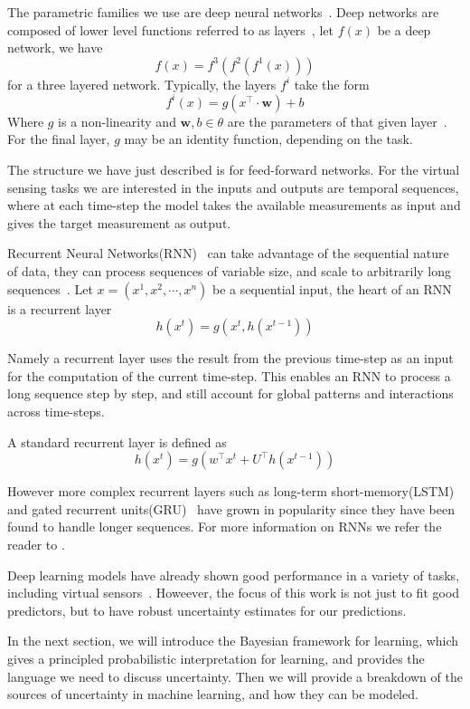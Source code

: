 \documentclass[../main.tex]{subfiles}
\begin{document}
The parametric families we use are deep neural networks~\citep{goodfellow2016deep}. Deep networks are composed of lower level functions referred to as layers~\citep[chapter~6]{goodfellow2016deep}, let $f(x)$ be a deep network, we have  
$$
    f(x) = f^3(f^2(f^1(x)))
$$
for a three layered network. Typically, the layers $f^i$ take the form 
$$
    f^i(x) = g(x^\top \cdot \mathbf{w}) + b
$$
Where $g$ is a non-linearity and $\mathbf{w}, b \in \theta$ are the parameters of that given layer~\citep[chapter~6]{goodfellow2016deep}. For the final layer, $g$ may be an identity function, depending on the task.

The structure we have just described is for feed-forward networks.
For the virtual sensing tasks we are interested in the inputs and outputs are temporal sequences, where at each time-step the model takes the available measurements as input and gives the target measurement as output.

Recurrent Neural Networks(RNN)~\citep{rumelhart1986learning} can take advantage of the sequential nature of data, they can process sequences of variable size, and scale to arbitrarily long sequences~\cite[chapter~10]{goodfellow2016deep}.
Let $x=(x^1, x^2, \cdots, x^n)$ be a sequential input, the heart of an RNN is a recurrent layer
$$
    h(x^t) = g(x^t, h(x^{t-1}))
$$

Namely a recurrent layer uses the result from the previous time-step as an input for the computation of the current time-step. This enables an RNN to process a long sequence step by step, and still account for global patterns and interactions across time-steps. 

A standard recurrent layer is defined as~\citep{pascanu2013construct}
$$
        h(x^t) = g(w^\top x^t + U^\top h(x^{t-1}))
$$

However more complex recurrent layers such as long-term short-memory(LSTM)~\citep{hochreiter1997long} and gated recurrent units(GRU)~\citep{cho2014learning} have grown in popularity since they have been found to handle longer sequences. For more information on RNNs we refer the reader to \cite[chapter~10]{goodfellow2016deep}.

Deep learning models have already shown good performance in a variety of tasks, including virtual sensors~\citep{graber2018hybrid, alonso2019virtual, escobedo2016neural, iwashita2019tu}.
Howeever, the focus of this work is not just to fit good predictors, but to have robust uncertainty estimates for our predictions.

In the next section, we will introduce the Bayesian framework for learning, which gives a principled probabilistic interpretation for learning, and provides the language we need to discuss uncertainty. Then we will provide a breakdown of the sources of uncertainty in machine learning, and how they can be modeled.  
\end{document}
